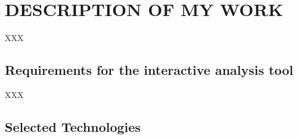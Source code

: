 \chapter{DESCRIPTION OF MY WORK}
\label{chap:five}
XXX
\section{Requirements for the interactive analysis tool}
\label{sec:req}
XXX
\section{Selected Technologies}
\label{sec:final_dec}